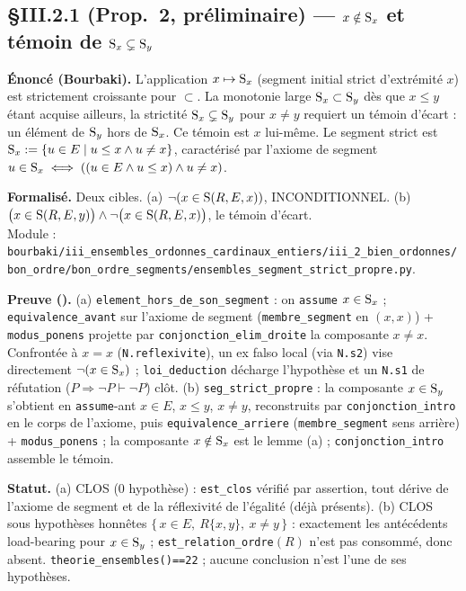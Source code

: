 \subsection{§III.2.1 (Prop.~2, préliminaire) --- $x\notin \mathrm{S}_x$ et témoin de $\mathrm{S}_x \subsetneq \mathrm{S}_y$}
\textbf{Énoncé (Bourbaki).} L'application $x\mapsto \mathrm{S}_x$ (segment initial strict d'extrémité $x$) est strictement croissante pour $\subset$. La monotonie large $\mathrm{S}_x\subset\mathrm{S}_y$ dès que $x\le y$ étant acquise ailleurs, la strictité $\mathrm{S}_x\subsetneq\mathrm{S}_y$ pour $x\neq y$ requiert un témoin d'écart : un élément de $\mathrm{S}_y$ hors de $\mathrm{S}_x$. Ce témoin est $x$ lui-même. Le segment strict est $\mathrm{S}_x := \{u\in E \mid u\le x \wedge u\neq x\}$, caractérisé par l'axiome de segment $u\in\mathrm{S}_x \iff ((u\in E \wedge u\le x)\wedge u\neq x)$.

\textbf{Formalisé.} Deux cibles. (a) $\neg(x\in\mathrm{S}(R,E,x))$, INCONDITIONNEL. (b) $\bigl(x\in\mathrm{S}(R,E,y)\bigr)\wedge\neg\bigl(x\in\mathrm{S}(R,E,x)\bigr)$, le témoin d'écart. \\
Module : \texttt{bourbaki/iii\_ensembles\_ordonnes\_cardinaux\_entiers/iii\_2\_bien\_ordonnes/bon\_ordre/bon\_ordre\_segments/ensembles\_segment\_strict\_propre.py}.

\textbf{Preuve (\Nstar).} (a) \texttt{element\_hors\_de\_son\_segment} : on \texttt{assume} $x\in\mathrm{S}_x$ ; \texttt{equivalence\_avant} sur l'axiome de segment (\texttt{membre\_segment} en $(x,x)$) + \texttt{modus\_ponens} projette par \texttt{conjonction\_elim\_droite} la composante $x\neq x$. Confrontée à $x=x$ (\texttt{N.reflexivite}), un ex falso local (via \texttt{N.s2}) vise directement $\neg(x\in\mathrm{S}_x)$ ; \texttt{loi\_deduction} décharge l'hypothèse et un \texttt{N.s1} de réfutation ($P\Rightarrow\neg P \vdash \neg P$) clôt. (b) \texttt{seg\_strict\_propre} : la composante $x\in\mathrm{S}_y$ s'obtient en \texttt{assume}-ant $x\in E$, $x\le y$, $x\neq y$, reconstruits par \texttt{conjonction\_intro} en le corps de l'axiome, puis \texttt{equivalence\_arriere} (\texttt{membre\_segment} sens arrière) + \texttt{modus\_ponens} ; la composante $x\notin\mathrm{S}_x$ est le lemme (a) ; \texttt{conjonction\_intro} assemble le témoin.

\textbf{Statut.} (a) CLOS (0 hypothèse) : \texttt{est\_clos} vérifié par assertion, tout dérive de l'axiome de segment et de la réflexivité de l'égalité (déjà présents). (b) CLOS sous hypothèses honnêtes $\{\,x\in E,\ R\{x,y\},\ x\neq y\,\}$ : exactement les antécédents load-bearing pour $x\in\mathrm{S}_y$ ; \texttt{est\_relation\_ordre}$(R)$ n'est pas consommé, donc absent. \texttt{theorie\_ensembles()==22} ; aucune conclusion n'est l'une de ses hypothèses.

